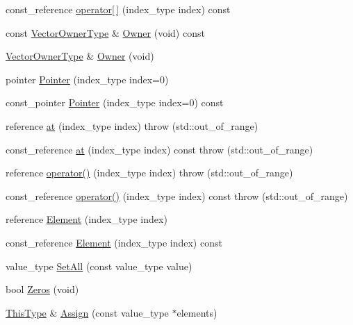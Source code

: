 \begin{DoxyCompactItemize}
\item 
const\-\_\-reference \hyperlink{classvct_dynamic_vector_base_a88f9f5af3f9381a5a96b60d1eddffe09}{operator\mbox{[}$\,$\mbox{]}} (index\-\_\-type index) const 
\item 
const \hyperlink{classvct_dynamic_vector_base_a563d79f5b4dd71f037192fe2961b48eb}{Vector\-Owner\-Type} \& \hyperlink{classvct_dynamic_vector_base_a0aaf6fd5bab4cbdf8d4fa82c714933f4}{Owner} (void) const 
\item 
\hyperlink{classvct_dynamic_vector_base_a563d79f5b4dd71f037192fe2961b48eb}{Vector\-Owner\-Type} \& \hyperlink{classvct_dynamic_vector_base_ab79d7986566cc243e97688fc3f715cfb}{Owner} (void)
\item 
pointer \hyperlink{classvct_dynamic_vector_base_a00f5d63bffcb55c825b0f75e91c8a291}{Pointer} (index\-\_\-type index=0)
\item 
const\-\_\-pointer \hyperlink{classvct_dynamic_vector_base_afd12e61375a9146ea5b6944b98dadf38}{Pointer} (index\-\_\-type index=0) const 
\item 
reference \hyperlink{classvct_dynamic_vector_base_a03f2316e98cb6eafca55501f12c9172a}{at} (index\-\_\-type index)  throw (std\-::out\-\_\-of\-\_\-range)
\item 
const\-\_\-reference \hyperlink{classvct_dynamic_vector_base_a29413207bf990dc9d3287646d4cc9737}{at} (index\-\_\-type index) const   throw (std\-::out\-\_\-of\-\_\-range)
\item 
reference \hyperlink{classvct_dynamic_vector_base_ae92326b64db6d69f66a07f84f2e4ba51}{operator()} (index\-\_\-type index)  throw (std\-::out\-\_\-of\-\_\-range)
\item 
const\-\_\-reference \hyperlink{classvct_dynamic_vector_base_a69688eb852e014ad42579da676dbb855}{operator()} (index\-\_\-type index) const   throw (std\-::out\-\_\-of\-\_\-range)
\item 
reference \hyperlink{classvct_dynamic_vector_base_a8b1a7efd0d0bb21b701a4461d79c7da2}{Element} (index\-\_\-type index)
\item 
const\-\_\-reference \hyperlink{classvct_dynamic_vector_base_a991666c27b8c59dbf0548aa635b8e3c5}{Element} (index\-\_\-type index) const 
\item 
value\-\_\-type \hyperlink{classvct_dynamic_vector_base_a0cf13429dcd83b565c3cbd7e30ecdec7}{Set\-All} (const value\-\_\-type value)
\item 
bool \hyperlink{classvct_dynamic_vector_base_a3b6cf5114c3971757b595c4181759393}{Zeros} (void)
\item 
\hyperlink{classvct_dynamic_const_vector_base_a39da273523717f678f54d3321ebca3dd}{This\-Type} \& \hyperlink{classvct_dynamic_vector_base_a321c52baa29a91ba074899f39c1d8c23}{Assign} (const value\-\_\-type $\ast$elements)

\end{DoxyCompactItemize}
